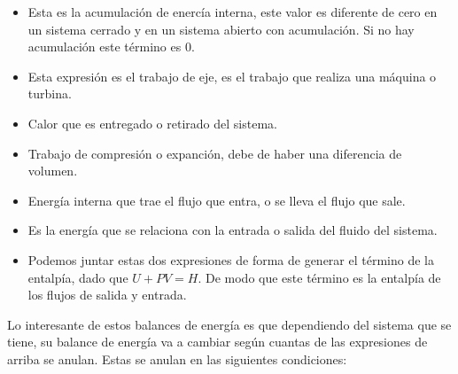 \begin{itemize}
    \item Esta es la acumulación de enercía interna, este valor es diferente de cero en un sistema cerrado y en un sistema abierto con acumulación. Si no hay acumulación este término es 0. 
    \item  Esta expresión es el trabajo de eje, es el trabajo que realiza una máquina o turbina.
    \item Calor que es entregado o retirado del sistema.
    

    \item Trabajo de compresión o expanción, debe de haber una diferencia de volumen.
    

    \item Energía interna que trae el flujo que entra, o se lleva el flujo que sale.
    

    \item Es la energía que se relaciona con la entrada o salida del fluido del sistema.
    
    
    \item Podemos juntar estas dos expresiones de forma de generar el término de la entalpía, dado que $U+PV=H$. De modo que este término es la entalpía de los flujos de salida y entrada.
    
\end{itemize}

Lo interesante de estos balances de energía es que dependiendo del sistema que se tiene, su balance de energía va a cambiar según cuantas de las expresiones de arriba se anulan. Estas se anulan en las siguientes condiciones:

